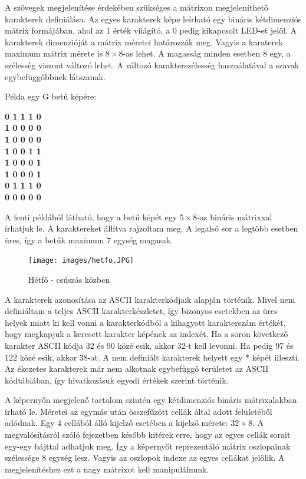 \documentclass[a4paper, 12pt]{article}
\begin{document}
A szövegek megjelenítése érdekében szükséges a mátrixon megjeleníthető karakterek definiálása. Az egyes karakterek képe leírható egy bináris kétdimenziós mátrix formájában, ahol az 1 érték világító, a 0 pedig kikapcsolt LED-et jelöl.
A karakterek dimenzióját a mátrix méretei határozzák meg. Vagyis a karaterek maximum mátrix mérete is $8\times 8$-as lehet. A magasság minden esetben 8 egy, a szélesség viszont változó lehet. A változó karakterszélesség használatával a szavak egybefüggőbbnek látszanak.

Példa egy G betű képére:
\begin{center}
\textbf{0 1 1 1 0\\
1 0 0 0 0\\
1 0 0 0 0\\
1 0 0 1 1\\
1 0 0 0 1\\
1 0 0 0 1\\
0 1 1 1 0\\
0 0 0 0 0}
\end{center}
A fenti példából látható, hogy a betű képét egy $5\times 8$-as bináris mátrixxal írhatjuk le. A karaktereket állítva rajzoltam meg. A legalsó sor a legtöbb esetben üres, így a betűk maximum 7 egység magasak.

\begin{figure}[ht]
	\centering
	\texttt{[image: images/hetfo.JPG]}
	\caption{Hétfő - csúszás közben}
	\label{fig:hetfo}
\end{figure}	


A karakterek azonosítása az ASCII karakterkódjaik alapján történik. Mivel nem definiáltam a teljes ASCII karakterkészletet, így bizonyos esetekben az üres helyek miatt ki kell vonni a karakterkódból a kihagyott karakterszám értékét, hogy megkapjuk a keresett karakter képének az indexét.
Ha a soron következő karakter ASCII kódja 32 és 90 közé esik, akkor 32-t kell levonni. Ha pedig 97 és 122 közé esik, akkor 38-at. A nem definiált karakterek helyett egy * képét illeszti.
Az ékezetes karakterek már nem alkotnak egybefüggő területet az ASCII kódtáblában, így hivatkozásuk egyedi értékek szerint történik.

A képernyőn megjelenő tartalom szintén egy kétdimenziós bináris mátrixalakban írható le. Méretei az egymás után összefűzött cellák által adott felületéből adódnak. Egy 4 cellából álló kijelző esetében a kijelző mérete: $32\times 8$.
A megvalósításról szóló fejezetben később kitérek erre, hogy az egyes cellák sorait egy-egy bájttal adhatjuk meg. Így a képernyőt reprezentáló mátrix oszlopainak szélessége 8 egység lesz. Vagyis az oszlopok indexe az egyes cellákat jelölik. 
A megjelenítéshez ezt a nagy mátrixot kell manipulálnunk.
\end{document}
